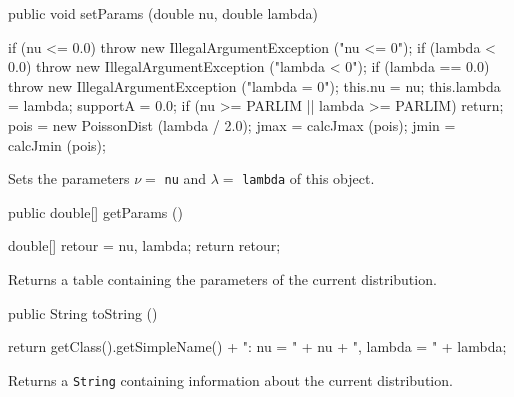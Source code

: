  \begin{code}

   public void setParams (double nu, double lambda)\begin{hide} {
      if (nu <= 0.0)
         throw new IllegalArgumentException ("nu <= 0");
      if (lambda < 0.0)
         throw new IllegalArgumentException ("lambda < 0");
      if (lambda == 0.0)
         throw new IllegalArgumentException ("lambda = 0");
      this.nu = nu;
      this.lambda = lambda;
      supportA = 0.0;
      if (nu >= PARLIM || lambda >= PARLIM)
         return;
      pois = new PoissonDist (lambda / 2.0);
      jmax = calcJmax (pois);
      jmin = calcJmin (pois);
   }\end{hide}
\end{code}
 \begin{tabb} Sets the parameters $\nu =$ \texttt{nu} and $\lambda = $
  \texttt{lambda} of this object.
 \end{tabb}
 \begin{code}

   public double[] getParams ()\begin{hide} {
      double[] retour = {nu, lambda};
      return retour;
   }\end{hide}
\end{code}
\begin{tabb}
   Returns a table containing the parameters of the current distribution.
\end{tabb}
\begin{hide}\begin{code}

   public String toString ()\begin{hide} {
      return getClass().getSimpleName() + ":   nu = " + nu + ",   lambda = " + lambda;
   }\end{hide}
\end{code}
\begin{tabb}
   Returns a \texttt{String} containing information about the current distribution.
\end{tabb}\end{hide}
\begin{code}\begin{hide}
}\end{hide}
\end{code}
